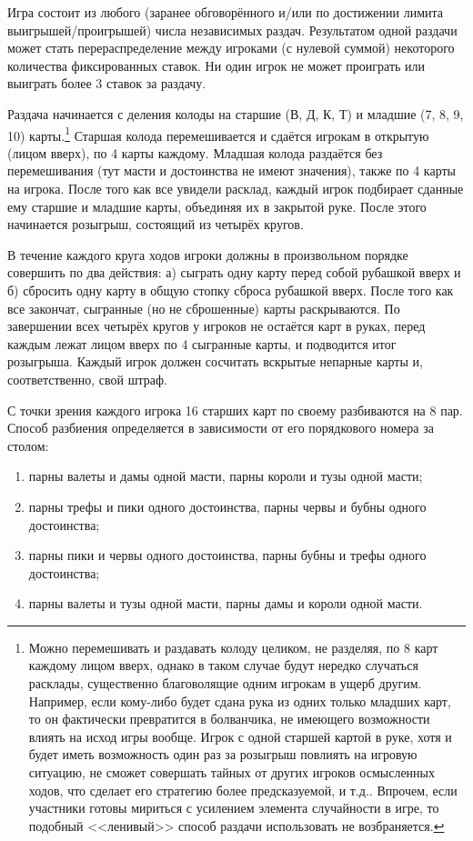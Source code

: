 Игра состоит из любого (заранее обговорённого и/или по достижении лимита выигрышей/проигрышей) числа независимых раздач. Результатом одной раздачи может стать перераспределение между игроками (с нулевой суммой) некоторого количества фиксированных ставок. Ни один игрок не может проиграть или выиграть более 3 ставок за раздачу.

Раздача начинается с деления колоды на старшие (В, Д, К, Т) и младшие (7, 8, 9, 10) карты.\footnote{Можно перемешивать и раздавать колоду целиком, не разделяя, по 8 карт каждому лицом вверх, однако в таком случае будут нередко случаться расклады, существенно благоволящие одним игрокам в ущерб другим. Например, если кому-либо будет сдана рука из одних только младших карт, то он фактически превратится в болванчика, не имеющего возможности влиять на исход игры вообще. Игрок с одной старшей картой в руке, хотя и будет иметь возможность один раз за розыгрыш повлиять на игровую ситуацию, не сможет совершать тайных от других игроков осмысленных ходов, что сделает его стратегию более предсказуемой, и т.д.. Впрочем, если участники готовы мириться с усилением элемента случайности в игре, то подобный <<ленивый>> способ раздачи использовать не возбраняется.} Старшая колода перемешивается и сдаётся игрокам в открытую (лицом вверх), по 4 карты каждому. Младшая колода раздаётся без перемешивания (тут масти и достоинства не имеют значения), также по 4 карты на игрока. После того как все увидели расклад, каждый игрок подбирает сданные ему старшие и младшие карты, объединяя их в закрытой руке. После этого начинается розыгрыш, состоящий из четырёх кругов.

В течение каждого круга ходов игроки должны в произвольном порядке совершить по два действия: а) сыграть одну карту перед собой рубашкой вверх и б) сбросить одну карту в общую стопку сброса рубашкой вверх. После того как все закончат, сыгранные (но не сброшенные) карты раскрываются. По завершении всех четырёх кругов у игроков не остаётся карт в руках, перед каждым лежат лицом вверх по 4 сыгранные карты, и подводится итог розыгрыша. Каждый игрок должен сосчитать вскрытые непарные карты и, соответственно, свой штраф.

С точки зрения каждого игрока 16 старших карт по своему разбиваются на 8 пар. Способ разбиения определяется в зависимости от его порядкового номера за столом:
\begin{enumerate}
	\item парны валеты и дамы одной масти, парны короли и тузы одной масти;
	\item парны трефы и пики одного достоинства, парны червы и бубны одного достоинства;
	\item парны пики и червы одного достоинства, парны бубны и трефы одного достоинства;
	\item парны валеты и тузы одной масти, парны дамы и короли одной масти.
\end{enumerate}

